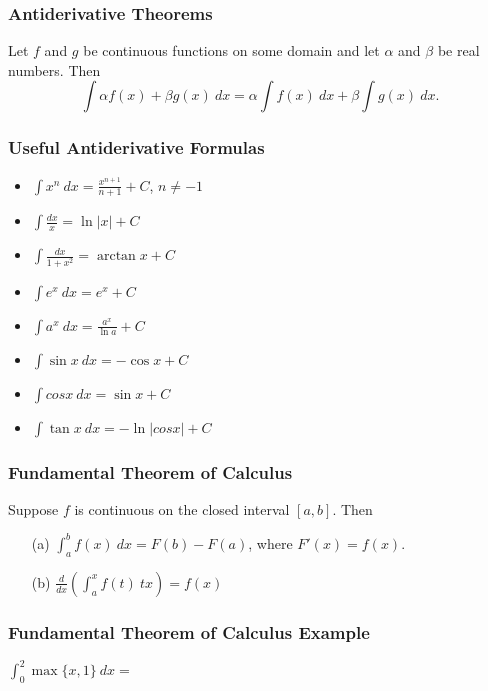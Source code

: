 \documentclass{beamer}
\begin{document}
\begin{frame}
\frametitle{Antiderivative Theorems}
\begin{Theorem}
Let $f$ and $g$ be continuous functions on some domain and let $\alpha$ and $\beta$ be real numbers. Then
$$
\int \alpha f(x) + \beta g(x)\ dx = \alpha \int f(x)\ dx + \beta \int g(x)\ dx.
$$
\end{Theorem}
\end{frame}

\begin{frame}
\frametitle{Useful Antiderivative Formulas}
\begin{multicols}{2}
{\small 
\begin{itemize}
\item $\displaystyle \int x^n\ dx = \frac{x^{n+ 1}}{n+ 1} + C$, $n\neq -1$
\item $\displaystyle \int \frac{dx}{x} = \ln|x| + C$	
\item $\displaystyle \int \frac{dx}{1 + x^2} = \arctan x + C$	
\item $\displaystyle \int e^x\ dx  = e^x + C$
\item $\displaystyle \int a^x\ dx = \frac{a^x}{\ln a} + C$
\item $\displaystyle\int \sin x\ dx = -\cos x + C$
\item $\displaystyle \int cos x\ dx= \sin x + C$
\item $\displaystyle\int \tan x\ dx = -\ln|cos x| + C$
\end{itemize}
}
\end{multicols}

\end{frame}

\begin{frame}
\frametitle{Fundamental Theorem of Calculus}

\begin{Theorem}
Suppose $f$ is continuous on the closed interval $[a, b]$. Then
\begin{enumerate}
\item[(a)] $\displaystyle\int_a^b f(x)\ dx = F(b) - F(a)$, where $F'(x)= f(x)$.
\item[(b)] $\displaystyle\frac{d}{dx}\left(\int_a^x f(t)\ tx\right) = f(x)$
\end{enumerate}
\end{Theorem}
\end{frame}

\begin{frame}[t]
\frametitle{Fundamental Theorem of Calculus Example}

\begin{Example}
$\displaystyle \int_0^2 \max\{x, 1\}\ dx = $
\end{Example}

\end{frame}
\end{document}
